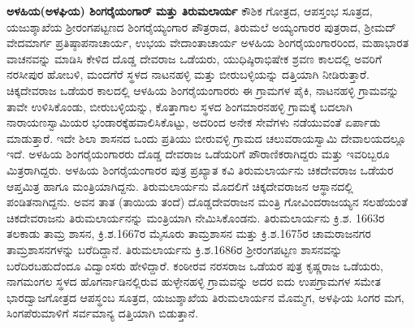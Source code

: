 \textbf{ಅಳಹಿಯ(ಅಳಘಿಯ) ಶಿಂಗರೈಯಂಗಾರ್​ ಮತ್ತು ತಿರುಮಲಾರ್ಯ} ಕೌಶಿಕ ಗೋತ್ರದ, ಆಪಸ್ತಂಭ ಸೂತ್ರದ, ಯಜುಶ್ಶಾಖೆಯ ಶ‍್ರೀರಂಗಪಟ್ಟಣದ ಶಿಂಗರೈಯ್ಯಂಗಾರ ಪೌತ್ರರಾದ, ತಿರುಮಲೆ ಅಯ್ಯಂಗಾರರ ಪುತ್ರರಾದ, ಶ‍್ರೀಮದ್​ ವೇದಮಾರ್ಗ ಪ್ರತಿಷ್ಠಾಪನಾಚಾರ್ಯ, ಉಭಯ ವೇದಾಂತಾಚಾರ್ಯ ಅಳಹಿಯ ಶಿಂಗರೈಯಂಗಾರರಿಂದ, ಮಹಾಭಾರತ ವಾಚನವನ್ನು ಮಾಡಿಸಿ ಕೇಳಿದ ದೊಡ್ಡ ದೇವರಾಜ ಒಡೆಯರು, ಯುಧಿಷ್ಠಿರಾಭಿಷೇಕ ಶ್ರವಣ ಕಾಲದಲ್ಲಿ ಅವರಿಗೆ ನರಸೀಪುರ ಹೋಬಳಿ, ಮಂದಗೆರೆ ಸ್ಥಳದ ನಾಟನಹಳ್ಳಿ ಮತ್ತು ಬೀರುಬಳ್ಳಿಯನ್ನು ದತ್ತಿಯಾಗಿ ನೀಡಿರುತ್ತಾರೆ. ಚಿಕ್ಕದೇವರಾಜ ಒಡೆಯರ ಕಾಲದಲ್ಲಿ ಆಳಹಿಯ ಶಿಂಗರೈಯಂಗಾರರು ಈ ಗ್ರಾಮಗಳ ಪೈಕಿ, ನಾಟನಹಳ್ಳಿ ಗ್ರಾಮವನ್ನು ತಾವೇ ಉಳಿಸಿಕೊಂಡು, ಬೀರುಬಳ್ಳಿಯನ್ನು, ಕೊತ್ತಾಗಾಲ ಸ್ಥಳದ ಶಿಂಗಮಾರನಹಳ್ಳಿ ಗ್ರಾಮಕ್ಕೆ ಬದಲಾಗಿ ನಾರಾಯಣಸ್ವಾಮಿಯರ ಭಂಡಾರಕ್ಕೆ\break ಹವಾಲಿಸಿಕೊಟ್ಟು, ಅದರಿಂದ ಅನೇಕ ಸೇವೆಗಳು ನಡೆಯುವಂತೆ ಏರ್ಪಾಡು ಮಾಡುತ್ತಾರೆ. ಇದೇ ಶಿಲಾ ಶಾಸನದ ಒಂದು ಪ್ರತಿಯು ಬೀರುವಳ್ಳಿ ಗ್ರಾಮದ ಚಲುವರಾಯಸ್ವಾಮಿ ದೇವಾಲಯದಲ್ಲೂ ಇದೆ. ಅಳಹಿಯ ಶಿಂಗರೈಯಂಗಾರರು ದೊಡ್ಡ ದೇವರಾಜ ಒಡೆಯರಿಗೆ ಪೌರಾಣಿಕರಾಗಿದ್ದರು ಮತ್ತು ಇವರಿಬ್ಬರೂ ಮಿತ್ರರಾಗಿದ್ದರು. ಅಳಹಿಯ ಶಿಂಗರೈಯಂಗಾರರ ಪುತ್ರ ಪ್ರಖ್ಯಾತ ಕವಿ ತಿರುಮಲಾರ್ಯನು ಚಿಕದೇವರಾಜ ಒಡೆಯರ ಆಪ್ತಮಿತ್ರ ಹಾಗೂ ಮಂತ್ರಿಯಾಗಿದ್ದನು. ತಿರುಮಲಾರ್ಯನು ಮೊದಲಿಗೆ ಚಿಕ್ಕದೇವರಾಜನ ಆಸ್ಥಾನದಲ್ಲಿ ಪಂಡಿತನಾಗಿದ್ದನು. ಅವನ ತಾತ (ತಾಯಿಯ ತಂದೆ) ದೊಡ್ಡದೇವರಾಜನ ಮಂತ್ರಿ ಗೋವಿಂದರಾಜಯ್ಯನ ಸಲಹೆಯಂತೆ ಚಿಕದೇವರಾಜನು ತಿರುಮಲಾರ್ಯನನ್ನು ಮಂತ್ರಿಯಾಗಿ ನೇಮಿಸಿಕೊಂಡನು. ತಿರುಮಲಾರ್ಯನು ಕ್ರಿ.ಶ. 1663ರ ತಲಕಾಡು ತಾಮ್ರ ಶಾಸನ, ಕ್ರಿ.ಶ.1667ರ ಮೈಸೂರು ತಾಮ್ರಶಾಸನ ಮತ್ತು ಕ್ರಿ.ಶ.1675ರ ಚಾಮರಾಜನಗರ ತಾಮ್ರಶಾಸನಗಳನ್ನು ಬರೆದಿದ್ದಾನೆ. ತಿರುಮಲಾರ್ಯನು ಕ್ರಿ.ಶ.1686ರ ಶ‍್ರೀರಂಗಪಟ್ಟಣ ಶಾಸನವನ್ನು ಬರೆದಿರಬಹುದೆಂದೂ ವಿದ್ವಾಂಸರು ಹೇಳಿದ್ದಾರೆ. ಕಂಠೀರವ ನರಸರಾಜ ಒಡೆಯರ ಪುತ್ರ ಕೃಷ್ಣರಾಜ ಒಡೆಯರು, ನಾಗಮಂಗಲ ಸ್ಥಳದ ಹೊಗರ್ನಾಡಿನಲ್ಲಿರುವ ಹುಳ್ಳೇನಹಳ್ಳಿ ಗ್ರಾಮವನ್ನು ಅದರ ಐದು ಉಪಗ್ರಾಮಗಳ ಸಮೇತ ಭಾರದ್ವಾಜಗೋತ್ರದ ಆಪಸ್ಥಂಬ ಸೂತ್ರದ, ಯಜುಶ್ಶಾಖೆಯ ತಿರುಮಲಾರ್ಯನ ಮೊಮ್ಮಗ, ಅಳಘಿಯ ಸಿಂಗರ ಮಗ, ಸಿಂಗಪೆರುಮಾಳಿಗೆ ಸರ್ವಮಾನ್ಯ ದತ್ತಿಯಾಗಿ ಬಿಡುತ್ತಾನೆ.

